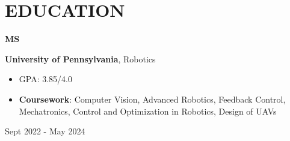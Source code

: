 

\setlength{\parskip}{3pt} %

\newenvironment{threecolentry}[3][]{
    \onecolentry
    \def\thirdColumn{#3}
    \setcolumnwidth{1 cm, \fill, 5 cm}
    \begin{paracol}{3}
    {\raggedright #2} \switchcolumn
}{
    \switchcolumn \raggedleft \thirdColumn
    \end{paracol}
    \endonecolentry
} %
\section{\textbf{EDUCATION}}
    \begin{threecolentry}{\textbf{MS}}{Sept 2022 - May 2024}
        \textbf{University of Pennsylvania}, Robotics
            \begin{itemize}[nosep,after=\strut, leftmargin=1em, itemsep=2pt]
                \item GPA: 3.85/4.0
                \item \textbf{Coursework}: Computer Vision, Advanced Robotics, Feedback Control, Mechatronics, Control and Optimization in Robotics, Design of UAVs
            \end{itemize}
    \end{threecolentry}
    

